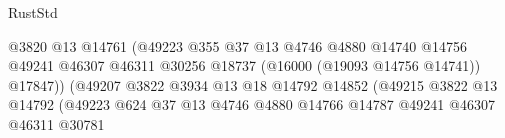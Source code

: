 \begin{lexlean}{RustStd}
\begin{coremodule}
                                                        @3820
                                                        @13
                                                        @14761
                                                        (@49223
                                                          @355
                                                          @37
                                                          @13
                                                          @4746
                                                          @4880
                                                          @14740
                                                          @14756
                                                          @49241
                                                          @46307
                                                          @46311
                                                          @30256
                                                          @18737
                                                          (@16000 (@19093 @14756 @14741))
                                                          @17847))
                                                      (@49207
                                                        @3822
                                                        @3934
                                                        @13
                                                        @18
                                                        @14792
                                                        @14852
                                                        (@49215
                                                          @3822
                                                          @13
                                                          @14792
                                                          (@49223
                                                            @624
                                                            @37
                                                            @13
                                                            @4746
                                                            @4880
                                                            @14766
                                                            @14787
                                                            @49241
                                                            @46307
                                                            @46311
                                                            @30781

\end{coremodule}
\end{lexlean}
